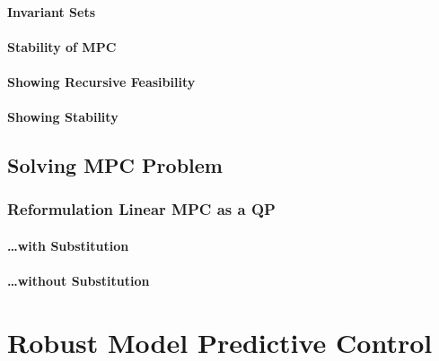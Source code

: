             \subsubsection{Invariant Sets} %

            \subsubsection{Stability of MPC} %

            \subsubsection{Showing Recursive Feasibility} %

            \subsubsection{Showing Stability} %

    \section{Solving MPC Problem} %

        \subsection{Reformulation Linear MPC as a QP} %

            \subsubsection{\dots with Substitution} %

            \subsubsection{\dots without Substitution} %

\chapter{Robust Model Predictive Control} %
	\label{c:mpcRobust}

